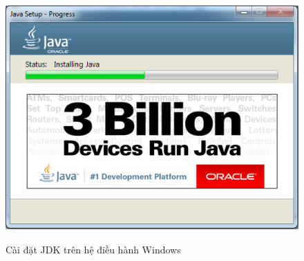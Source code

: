 \documentclass[13pt,a4paper]{extreport}
\begin{document}
\begin{itemize}
\begin{itemize}
\begin{figure}[!h]
\begin{center}
								{\includegraphics[scale=.5]{setup-JDK-6.png}}
								\hspace{.5cm}
						\end{center}
						\vspace{-.25cm}
						\caption{Cài đặt JDK trên hệ điều hành Windows}
						\vspace{-.5cm}
					\end{figure}
			\end{itemize}


\end{itemize}
\end{document}
